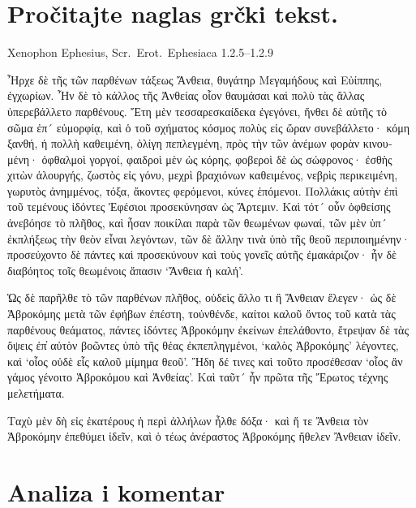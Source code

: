 
\section*{Pročitajte naglas grčki tekst.}

Xenophon Ephesius, Scr.\ Erot.\ Ephesiaca 1.2.5–1.2.9


\medskip


{\large

\begin{greek}

\noindent Ἦρχε δὲ τῆς τῶν παρθένων τάξεως Ἄνθεια, θυγάτηρ Μεγαμήδους καὶ Εὐίππης, ἐγχωρίων. Ἦν δὲ τὸ κάλλος τῆς Ἀνθείας οἷον θαυμάσαι καὶ πολὺ τὰς ἄλλας ὑπερεβάλλετο παρθένους. Ἔτη μὲν τεσσαρεσκαίδεκα ἐγεγόνει, ἤνθει δὲ αὐτῆς τὸ σῶμα ἐπ´ εὐμορφίᾳ, καὶ ὁ τοῦ σχήματος κόσμος πολὺς εἰς ὥραν συνεβάλλετο· κόμη ξανθή, ἡ πολλὴ καθειμένη, ὀλίγη πεπλεγμένη, πρὸς τὴν τῶν ἀνέμων φορὰν κινουμένη· ὀφθαλμοὶ γοργοί, φαιδροὶ μὲν ὡς κόρης, φοβεροὶ δὲ ὡς σώφρονος· ἐσθὴς χιτὼν ἁλουργής, ζωστὸς εἰς γόνυ, μεχρὶ βραχιόνων καθειμένος, νεβρὶς περικειμένη, γωρυτὸς ἀνημμένος, τόξα, ἄκοντες φερόμενοι, κύνες ἑπόμενοι. Πολλάκις αὐτὴν ἐπὶ τοῦ τεμένους ἰδόντες Ἐφέσιοι προσεκύνησαν ὡς Ἄρτεμιν. Καὶ τότ´ οὖν ὀφθείσης ἀνεβόησε τὸ πλῆθος, καὶ ἦσαν ποικίλαι παρὰ τῶν θεωμένων φωναί, τῶν μὲν ὑπ´ ἐκπλήξεως τὴν θεὸν εἶναι λεγόντων, τῶν δὲ ἄλλην τινὰ ὑπὸ τῆς θεοῦ περιποιημένην· προσεύχοντο δὲ πάντες καὶ προσεκύνουν καὶ τοὺς γονεῖς αὐτῆς ἐμακάριζον· ἦν δὲ διαβόητος τοῖς θεωμένοις ἅπασιν `Ἄνθεια ἡ καλή'. 

Ὡς δὲ παρῆλθε τὸ τῶν παρθένων πλῆθος, οὐδεὶς ἄλλο τι ἢ Ἄνθειαν ἔλεγεν· ὡς δὲ Ἁβροκόμης μετὰ τῶν ἐφήβων ἐπέστη, τοὐνθένδε, καίτοι καλοῦ ὄντος τοῦ κατὰ τὰς παρθένους θεάματος, πάντες ἰδόντες Ἁβροκόμην ἐκείνων ἐπελάθοντο, ἔτρεψαν δὲ τὰς ὄψεις ἐπ̓ αὐτὸν βοῶντες ὑπὸ τῆς θέας ἐκπεπληγμένοι, `καλὸς Ἁβροκόμης' λέγοντες, καὶ `οἷος οὐδὲ εἷς καλοῦ μίμημα θεοῦ'. Ἤδη δέ τινες καὶ τοῦτο προσέθεσαν `οἷος ἂν γάμος γένοιτο Ἁβροκόμου καὶ Ἀνθείας'. Καὶ ταῦτ´ ἦν πρῶτα τῆς Ἔρωτος τέχνης μελετήματα.

Ταχὺ μὲν δὴ εἰς ἑκατέρους ἡ περὶ ἀλλήλων ἦλθε δόξα· καὶ ἥ τε Ἄνθεια τὸν Ἁβροκόμην ἐπεθύμει ἰδεῖν, καὶ ὁ τέως ἀνέραστος Ἁβροκόμης ἤθελεν Ἄνθειαν ἰδεῖν.

\end{greek}

}


\section*{Analiza i komentar}

